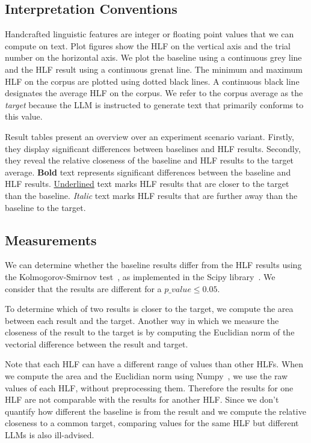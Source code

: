 \documentclass[11pt]{article}
\begin{document}
\subsection{Interpretation Conventions}

Handcrafted linguistic features are integer or floating point values that we
can compute on text.
Plot figures show the HLF on the vertical axis and the trial number on the horizontal
axis.
We plot the baseline using a continuous grey line and the HLF result using a
continuous grenat line.
The minimum and maximum HLF on the corpus are plotted using dotted black lines.
A continuous black line designates the average HLF on the corpus.
We refer to the corpus average as the \textit{target} because the LLM is
instructed to generate text that primarily conforms to this value.

Result tables present an overview over an experiment scenario variant.
Firstly, they display significant differences between baselines and HLF results.
Secondly, they reveal the relative closeness of the baseline and HLF results to
the target average.
\textbf{Bold} text represents significant differences between the baseline and
HLF results.
\underline{Underlined} text marks HLF results that are closer to the target than
the baseline.
\textit{Italic} text marks HLF results that are further away than the baseline
to the target.

\subsection{Measurements}\label{subsec:measurements}

We can determine whether the baseline results differ from the HLF results using
the Kolmogorov-Smirnov test~\cite{kolmogorov1933,smirnov1939}, as implemented in
the Scipy library~\cite{2020SciPy-NMeth}.
We consider that the results are different for a $p\_value \le 0.05$.

To determine which of two results is closer to the target, we compute the area
between each result and the target.
Another way in which we measure the closeness of the result to the target is by
computing the Euclidian norm of the vectorial difference between the result and
target.

Note that each HLF can have a different range of values than other HLFs.
When we compute the area and the Euclidian norm using Numpy~\cite{harris2020array},
we use the raw values of each HLF, without preprocessing them.
Therefore the results for one HLF are not comparable with the results for
another HLF.\@
Since we don't quantify how different the baseline is from the result and we
compute the relative closeness to a common target, comparing values for the same
HLF but different LLMs is also ill-advised.
\end{document}
